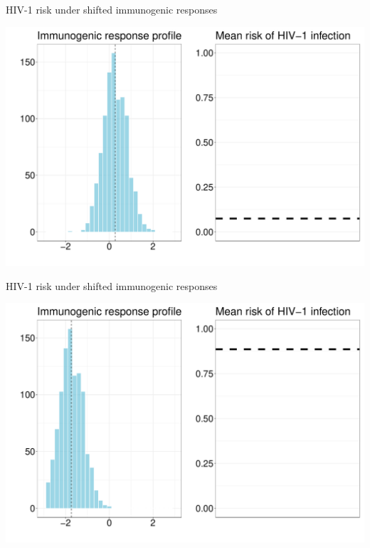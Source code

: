 \documentclass{beamer}
\begin{document}
\begin{frame}[c]{HIV-1 risk under shifted immunogenic responses}

\hspace*{-1cm}\includegraphics[scale=0.4]{shift-1}

\note{
}

\end{frame}


\begin{frame}[c,noframenumbering]{HIV-1 risk under shifted immunogenic responses}

\hspace*{-1cm}\includegraphics[scale=0.4]{shift-2}

\note{
}

\end{frame}
\end{document}
